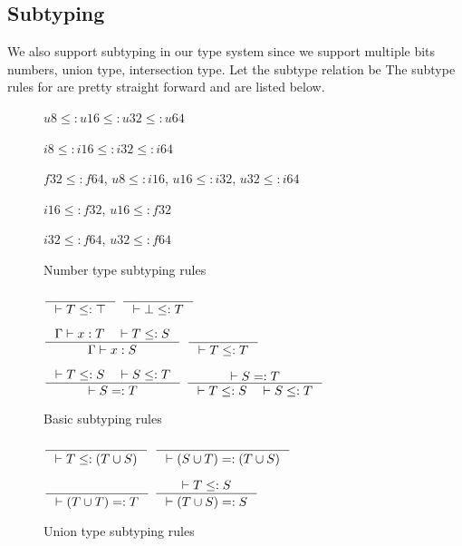 \documentclass[acmsmall,nonacm]{acmart}\settopmatter{printfolios=true,printccs=false,printacmref=false}
\newcommand{\rhyme}{\text{Rhyme}\xspace}
\begin{document}
\subsection{Subtyping}
\iffalse
We also support subtyping in our type system since we support multiple bits numbers, union type, intersection type. Let the subtype relation be The subtype rules for \rhyme are pretty straight forward and are listed below.\par
\noindent
\begin{minipage}{0.5\textwidth}
\begin{figure}[H]
  \centering
$u8 \leq: u16 \leq: u32 \leq: u64$\par
\vspace*{2mm}
$i8 \leq: i16 \leq: i32 \leq: i64$\par
\vspace*{2mm}
$f32 \leq: f64$, $u8 \leq: i16$, $u16 \leq: i32$, $u32 \leq: i64$\par
\vspace*{2mm}
$i16 \leq: f32$, $u16 \leq: f32$\par
\vspace*{2mm}
$i32 \leq: f64$, $u32 \leq: f64$
\caption*{Number type subtyping rules}
\end{figure}
\end{minipage}
\begin{minipage}{0.5\textwidth}
  \centering
\begin{figure}[H]
$\inference {} {|- T \leq: \top}$ \hspace*{10mm} $\inference {} {|- \bot \leq: T}$\par
\vspace*{4mm}
$\inference {\Gamma |- x: T \quad |- T \leq: S}{\Gamma |- x: S}$ \hspace*{4mm}
$\inference {}{|- T \leq: T}$\par
\vspace*{4mm}
$\inference {|- T \leq: S \quad |- S \leq: T}{|- S =: T}$
$\inference {|- S =: T}{|- T \leq: S \quad |- S \leq: T}$
\caption*{Basic subtyping rules}
\end{figure}
\end{minipage}
\begin{minipage}{0.5\textwidth}
\begin{figure}[H]
  \centering
\vspace*{5mm}
$\inference {}{|- T \leq: (T \cup S)}$\hspace*{2mm}
$\inference {}{|- (S \cup T) =: (T \cup S)}$\par
\vspace*{4mm}
$\inference {}{|- (T \cup T) =: T}$\hspace*{2mm}
$\inference {|- T \leq: S}{|- (T \cup S) =: S}$
\caption*{Union type subtyping rules}
\end{figure}
\end{minipage}
\end{document}
